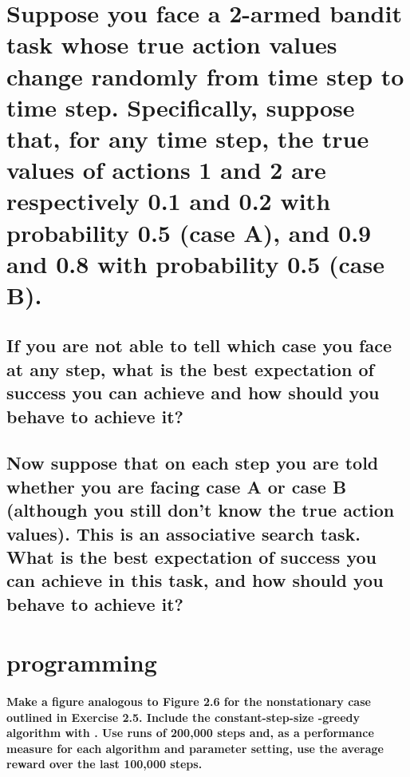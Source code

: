 \documentclass{article}
\begin{document}
\section{Suppose you face a 2-armed bandit task whose true action values change randomly from time step to time step. Specifically, suppose that, for any time step, the true values of actions 1 and 2 are respectively 0.1 and 0.2 with probability 0.5 (case A), and 0.9 and 0.8 with probability 0.5 (case B).}
\subsection{If you are not able to tell which case you face at any step, what is the best expectation of success you can achieve and how should you behave to achieve it?}
\subsection{Now suppose that on each step you are told whether you are facing case A or case B (although you still don't know the true action values). This is an associative search task. What is the best expectation of success you can achieve in this task, and how should you behave to achieve it?}

\section{programming}
\paragraph{Make a figure analogous to Figure 2.6 for the nonstationary case outlined in Exercise 2.5. Include the constant-step-size \textepsilon-greedy algorithm with . Use runs of 200,000 steps and, as a performance measure for each algorithm and parameter setting, use the average reward over the last 100,000 steps.}
\end{document}
